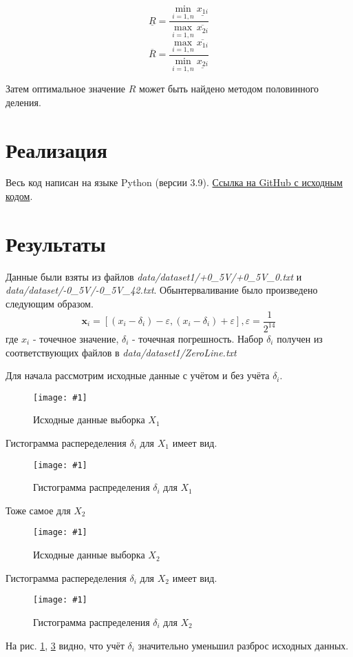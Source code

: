 \documentclass[a4paper,12pt]{article}
\newcommand{\plot}[3]{
    \begin{figure}[H]
        \begin{center}
            \texttt{[image: \#1]}
            \caption{#2}
            \label{#3}
        \end{center}
    \end{figure}
}
\begin{document}
    \begin{equation}
        \underline{R} = \frac{\min_{i=1,n}\underline{x_{1i}}}{\max_{i=1,n}\overline{x_{2i}}}
        \label{e:outerRMin}
    \end{equation}
    \begin{equation}
        \overline{R} = \frac{\max_{i=1,n}\overline{x_{1i}}}{\min_{i=1,n}\underline{x_{2i}}}
        \label{e:outerRMax}
    \end{equation}

    Затем оптимальное значение $ R $ может быть найдено методом половинного деления.

    \section{Реализация}
    \quad Весь код написан на языке Python (версии 3.9).
    \href{https://github.com/gobdr/interval_data_analysis/tree/master/lab1}{Ссылка на GitHub с исходным кодом}.

    \section{Результаты}
    \quad Данные были взяты из файлов \textsl{data/dataset1/+0\_5V/+0\_5V\_0.txt} и \textsl{data/dataset/-0\_5V/-0\_5V\_42.txt}.
    Обынтерваливание было произведено следующим образом.
    \begin{equation}
        \textbf{x}_i = [(x_i - \delta_i) - \varepsilon, (x_i - \delta_i) + \varepsilon], \varepsilon = \frac{1}{2^{14}}
    \end{equation}
    где $ x_i $ - точечное значение, $ \delta_i $ - точечная погрешность.
    Набор $ \delta_i $ получен из соответствующих файлов в \textsl{data/dataset1/ZeroLine.txt}

    Для начала рассмотрим исходные данные с учётом и без учёта $ \delta_i $.
    \plot{FixedDataX1}{Исходные данные выборка $ X_1 $}{p:rawSampleX1}
    Гистограмма распеределения $ \delta_i $ для $ X_1 $ имеет вид.
    \plot{DeltasHistX1}{Гистограмма распределения $ \delta_i $ для $ X_1 $}{p:deltasHistX1}

    Тоже самое для $ X_2 $
    \plot{FixedDataX2}{Исходные данные выборка $ X_2 $}{p:rawSampleX2}
    Гистограмма распеределения $ \delta_i $ для $ X_2 $ имеет вид.
    \plot{DeltasHistX2}{Гистограмма распределения $ \delta_i $ для $ X_2 $}{p:deltasHistX2}

    На рис. \ref{p:rawSampleX1}, \ref{p:rawSampleX2} видно, что учёт $ \delta_i $ значительно
    уменьшил разброс исходных данных.
\end{document}
